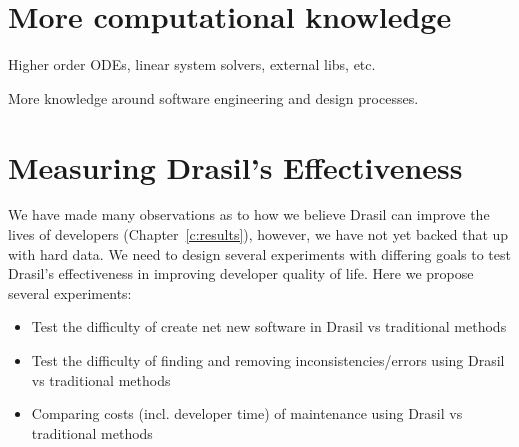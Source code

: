 \section{More computational knowledge}

Higher order ODEs, linear system solvers, external libs, etc.

More knowledge around software engineering and design processes.

\section{Measuring Drasil's Effectiveness}

We have made many observations as to how we believe Drasil can improve the 
lives of developers (Chapter~\ref{c:results}), however, we have not yet backed 
that up with hard data. We need to design several experiments with differing 
goals to test Drasil's effectiveness in improving developer quality of life. 
Here we propose several experiments:

\begin{itemize}
\item Test the difficulty of create net new software in Drasil vs traditional 
methods
\item Test the difficulty of finding and removing inconsistencies/errors using 
Drasil vs traditional methods
\item Comparing costs (incl. developer time) of maintenance using Drasil vs 
traditional methods
\end{itemize}



